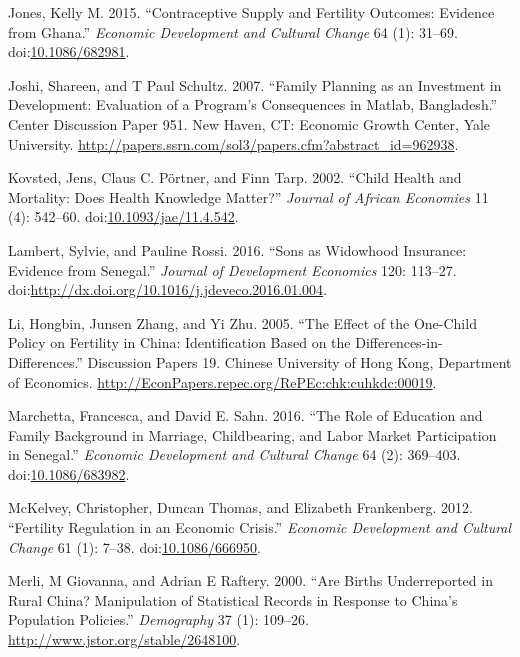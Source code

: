 \documentclass[]{article}
\begin{document}
\hypertarget{ref-Jones2015}{}
Jones, Kelly M. 2015. ``Contraceptive Supply and Fertility Outcomes: Evidence from Ghana.'' \emph{Economic Development and Cultural Change} 64 (1): 31--69. doi:\href{https://doi.org/10.1086/682981}{10.1086/682981}.

\hypertarget{ref-Joshi2007}{}
Joshi, Shareen, and T Paul Schultz. 2007. ``Family Planning as an Investment in Development: Evaluation of a Program's Consequences in Matlab, Bangladesh.'' Center Discussion Paper 951. New Haven, CT: Economic Growth Center, Yale University. \url{http://papers.ssrn.com/sol3/papers.cfm?abstract_id=962938}.

\hypertarget{ref-Kovsted2002}{}
Kovsted, Jens, Claus C. Pörtner, and Finn Tarp. 2002. ``Child Health and Mortality: Does Health Knowledge Matter?'' \emph{Journal of African Economies} 11 (4): 542--60. doi:\href{https://doi.org/10.1093/jae/11.4.542}{10.1093/jae/11.4.542}.

\hypertarget{ref-Lambert2016}{}
Lambert, Sylvie, and Pauline Rossi. 2016. ``Sons as Widowhood Insurance: Evidence from Senegal.'' \emph{Journal of Development Economics} 120: 113--27. doi:\href{https://doi.org/http://dx.doi.org/10.1016/j.jdeveco.2016.01.004}{http://dx.doi.org/10.1016/j.jdeveco.2016.01.004}.

\hypertarget{ref-Li2005}{}
Li, Hongbin, Junsen Zhang, and Yi Zhu. 2005. ``The Effect of the One-Child Policy on Fertility in China: Identification Based on the Differences-in-Differences.'' Discussion Papers 19. Chinese University of Hong Kong, Department of Economics. \url{http://EconPapers.repec.org/RePEc:chk:cuhkdc:00019}.

\hypertarget{ref-Marchetta2016}{}
Marchetta, Francesca, and David E. Sahn. 2016. ``The Role of Education and Family Background in Marriage, Childbearing, and Labor Market Participation in Senegal.'' \emph{Economic Development and Cultural Change} 64 (2): 369--403. doi:\href{https://doi.org/10.1086/683982}{10.1086/683982}.

\hypertarget{ref-McKelvey2012}{}
McKelvey, Christopher, Duncan Thomas, and Elizabeth Frankenberg. 2012. ``Fertility Regulation in an Economic Crisis.'' \emph{Economic Development and Cultural Change} 61 (1): 7--38. doi:\href{https://doi.org/10.1086/666950}{10.1086/666950}.

\hypertarget{ref-Merli2000}{}
Merli, M Giovanna, and Adrian E Raftery. 2000. ``Are Births Underreported in Rural China? Manipulation of Statistical Records in Response to China's Population Policies.'' \emph{Demography} 37 (1): 109--26. \url{http://www.jstor.org/stable/2648100}.
\end{document}
